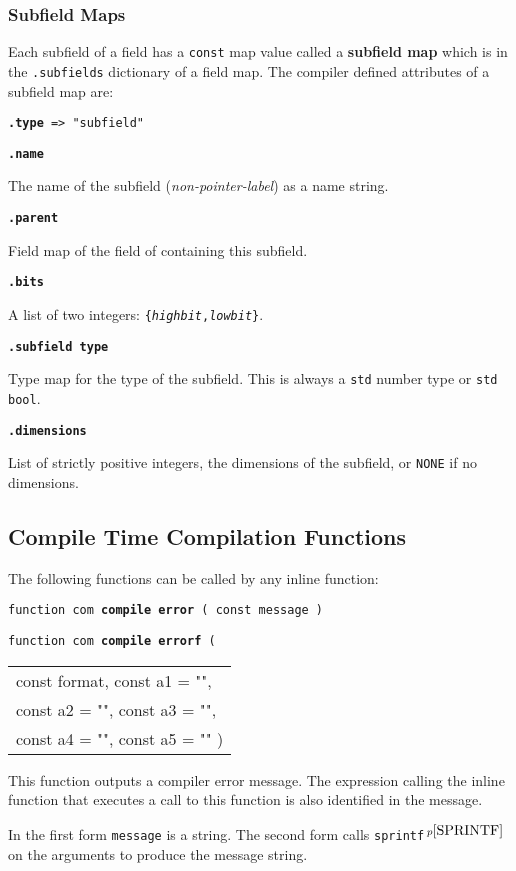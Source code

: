 \documentclass[12pt]{article}
\newcommand{\key}[1]{{\rm \bfseries #1}}
\newcommand{\ttkey}[1]{{\tt \bfseries #1}}
\newcommand{\pagnote}[1]{$\,^{p\pageref{#1}}$}
\newenvironment{indpar}[1][0.3in]%
	{\begin{list}{}%
		     {\setlength{\itemsep}{0in}%
		      \setlength{\topsep}{0in}%
		      \setlength{\parsep}{1ex}%
		      \setlength{\labelwidth}{#1}%
		      \setlength{\leftmargin}{#1}%
		      \addtolength{\leftmargin}{\labelsep}}%
	 \item}%
	{\end{list}}
\begin{document}
\subsubsection{Subfield Maps}
\label{SUBFIELD-MAPS}

Each subfield of a field has a {\tt const} map value called
a \key{subfield map} which is in the {\tt .subfields} dictionary of
a field map.  The compiler defined attributes of a subfield map are:

{\tt \ttkey{.type} => "subfield"}

\ttkey{.name}
\begin{indpar}
The name of the subfield ({\em non-pointer-label})
as a name string.
\end{indpar}

\ttkey{.parent}
\begin{indpar}
Field map of the field of containing this subfield.
\end{indpar}

\ttkey{.bits}
\begin{indpar}
A list of two integers: {\tt \{{\rm \em highbit},{\rm \em lowbit}\}}.
\end{indpar}

\ttkey{.subfield type}
\begin{indpar}
Type map for the type of the subfield.
This is always a {\tt std} number type or {\tt std bool}.
\end{indpar}

\ttkey{.dimensions}
\begin{indpar}
List of strictly positive integers,
the dimensions of the subfield, or {\tt NONE} if no dimensions.
\end{indpar}

\subsection{Compile Time Compilation Functions}
\label{COMPILE-TIME-COMPILATION-FUNCTIONS}

The following functions can be called by any inline function:

{\tt function com \ttkey{compile error} ( const message )}%
	\label{COMPILE-ERROR} \\
{\tt function com \ttkey{compile errorf}
     ( \begin{tabular}[t]{@{}l}
	const format, const a1 = "", \\
	const a2 = "", const a3 = "", \\
	const a4 = "", const a5 = "" )
	\end{tabular} }
\begin{indpar}
This function outputs a compiler error message.  The expression calling
the inline function that executes a call to this function is also
identified in the message.

In the first form {\tt message} is a string.  The second form
calls {\tt sprintf}\pagnote{SPRINTF} on the arguments to produce
the message string.

\end{indpar}
\end{document}
